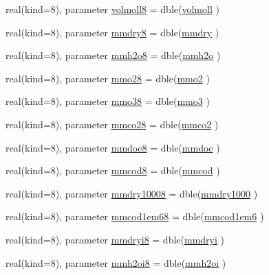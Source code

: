 \begin{DoxyCompactItemize}
real(kind=8), parameter \hyperlink{namespaceconsts__coms_af1e0f2c4db823ba0978a94ea03eb9158}{volmoll8} = dble(\hyperlink{namespaceconsts__coms_a8931f8cd781a8b09d11212c651fec485}{volmoll} )
\item 
real(kind=8), parameter \hyperlink{namespaceconsts__coms_a2eec42ad330677699998e5de193f8de3}{mmdry8} = dble(\hyperlink{namespaceconsts__coms_a7aa35c23be3fddc9db2686245d45cda1}{mmdry} )
\item 
real(kind=8), parameter \hyperlink{namespaceconsts__coms_a16b37e1505a8cc5ff91964cc28d72346}{mmh2o8} = dble(\hyperlink{namespaceconsts__coms_a613dd19deda61e084a0a1c445c059339}{mmh2o} )
\item 
real(kind=8), parameter \hyperlink{namespaceconsts__coms_a737139f9eca5b72bd0b26f75910c55df}{mmo28} = dble(\hyperlink{namespaceconsts__coms_a5f6f1ee45767d7fcd7c397df0631feab}{mmo2} )
\item 
real(kind=8), parameter \hyperlink{namespaceconsts__coms_aea51cb10ed09215243c1e9b5499fc337}{mmo38} = dble(\hyperlink{namespaceconsts__coms_a3d2db28ffe653e18e24973962ee92eb1}{mmo3} )
\item 
real(kind=8), parameter \hyperlink{namespaceconsts__coms_a8b53e3487c484355ec731d35ae57186f}{mmco28} = dble(\hyperlink{namespaceconsts__coms_ac39e12891c7cedb24326a132e7288337}{mmco2} )
\item 
real(kind=8), parameter \hyperlink{namespaceconsts__coms_aaab14da3d986d797ca230301cd6b3826}{mmdoc8} = dble(\hyperlink{namespaceconsts__coms_a59bb453864e15b4a294a2569058fca9d}{mmdoc} )
\item 
real(kind=8), parameter \hyperlink{namespaceconsts__coms_aae7cdd0c3c7745c9fab0969b83f90eed}{mmcod8} = dble(\hyperlink{namespaceconsts__coms_a35f71d51e4282f3fc1150564317c3a97}{mmcod} )
\item 
real(kind=8), parameter \hyperlink{namespaceconsts__coms_a22496e0e01ad463e5cc3cd1b4527193f}{mmdry10008} = dble(\hyperlink{namespaceconsts__coms_a17fe564075e4435419515e05d8a82022}{mmdry1000} )
\item 
real(kind=8), parameter \hyperlink{namespaceconsts__coms_a22a9b2490e13490aeeeeaffa137cfc47}{mmcod1em68} = dble(\hyperlink{namespaceconsts__coms_a25939fc53475af3a61a853e5adf1940c}{mmcod1em6} )
\item 
real(kind=8), parameter \hyperlink{namespaceconsts__coms_a3c57cfb68a588ad22205f473b45b0473}{mmdryi8} = dble(\hyperlink{namespaceconsts__coms_a3a3fc200d63c11c0ae055b6b513fd309}{mmdryi} )
\item 
real(kind=8), parameter \hyperlink{namespaceconsts__coms_aab0676d97b330f74a5658cc5436518b2}{mmh2oi8} = dble(\hyperlink{namespaceconsts__coms_ac580048533c43cb8473dcf3b620c9502}{mmh2oi} )

\end{DoxyCompactItemize}
